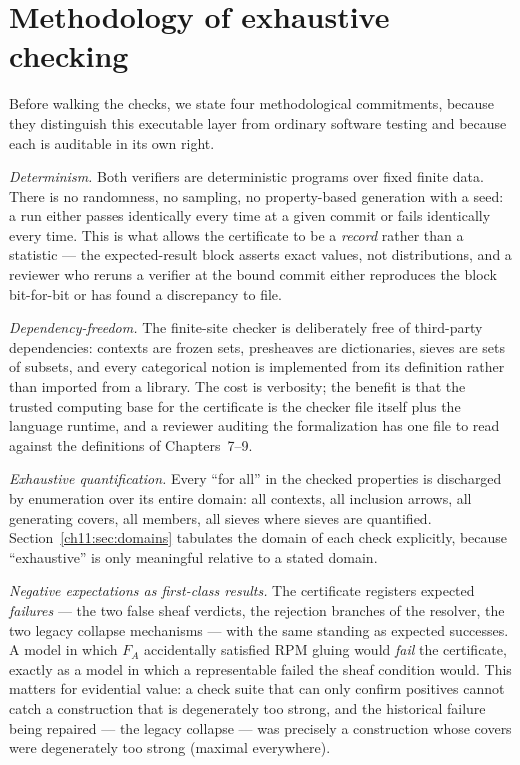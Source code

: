\section{Methodology of exhaustive checking}
\label{ch11:sec:methodology}

Before walking the checks, we state four methodological
commitments, because they distinguish this executable layer from ordinary
software testing and because each is auditable in its own right.

\emph{Determinism.} Both verifiers are deterministic programs over fixed
finite data. There is no randomness, no sampling, no property-based
generation with a seed: a run either passes identically every time at a
given commit or fails identically every time. This is what allows the
certificate to be a \emph{record} rather than a statistic --- the
expected-result block asserts exact values, not distributions, and a
reviewer who reruns a verifier at the bound commit either reproduces the
block bit-for-bit or has found a discrepancy to file.

\emph{Dependency-freedom.} The finite-site checker is deliberately free
of third-party dependencies: contexts are frozen sets, presheaves are
dictionaries, sieves are sets of subsets, and every categorical notion is
implemented from its definition rather than imported from a library. The
cost is verbosity; the benefit is that the trusted computing base for the
certificate is the checker file itself plus the language runtime, and a
reviewer auditing the formalization has one file to read against the
definitions of Chapters~7--9.

\emph{Exhaustive quantification.} Every ``for all'' in the checked
properties is discharged by enumeration over its entire domain: all
contexts, all inclusion arrows, all generating covers, all members, all
sieves where sieves are quantified. Section~\ref{ch11:sec:domains}
tabulates the domain of each check explicitly, because ``exhaustive'' is
only meaningful relative to a stated domain.

\emph{Negative expectations as first-class results.} The certificate
registers expected \emph{failures} --- the two false sheaf verdicts, the
rejection branches of the resolver, the two legacy collapse mechanisms
--- with the same standing as expected successes. A model in which
$F_A$ accidentally satisfied RPM gluing would \emph{fail} the
certificate, exactly as a model in which a representable failed the
sheaf condition would. This matters for evidential value: a check suite
that can only confirm positives cannot catch a construction that is
degenerately too strong, and the historical failure being repaired ---
the legacy collapse --- was precisely a construction whose covers were
degenerately too strong (maximal everywhere).

